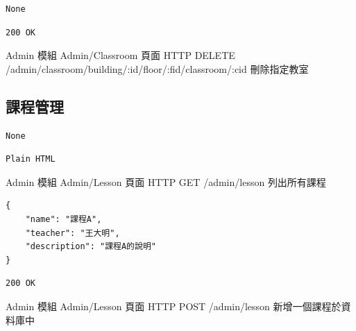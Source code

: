 \documentclass{article}
\begin{document}
\bigskip

\begin{lrbox}{\jsoninputbox}
	\begin{lstlisting}
None
\end{lstlisting}
\end{lrbox}

\begin{lrbox}{\jsonoutputbox}
	\begin{lstlisting}
200 OK
\end{lstlisting}
\end{lrbox}

{Admin 模組}
{Admin/Classroom 頁面}
{HTTP DELETE}
{/admin/classroom/building/:id/floor/:fid/classroom/:cid}
{刪除指定教室}

\pagebreak

\subsection{課程管理}

\begin{lrbox}{\jsoninputbox}
	\begin{lstlisting}
None
\end{lstlisting}
\end{lrbox}

\begin{lrbox}{\jsonoutputbox}
	\begin{lstlisting}
Plain HTML
\end{lstlisting}
\end{lrbox}

{Admin 模組}
{Admin/Lesson 頁面}
{HTTP GET}
{/admin/lesson}
{列出所有課程}

\bigskip

\begin{lrbox}{\jsoninputbox}
	\begin{lstlisting}[basicstyle=\tiny\ttfamily]
{
	"name": "課程A",
	"teacher": "王大明",
	"description": "課程A的說明"
}
\end{lstlisting}
\end{lrbox}

\begin{lrbox}{\jsonoutputbox}
	\begin{lstlisting}
200 OK
\end{lstlisting}
\end{lrbox}

{Admin 模組}
{Admin/Lesson 頁面}
{HTTP POST}
{/admin/lesson}
{新增一個課程於資料庫中}
\end{document}

